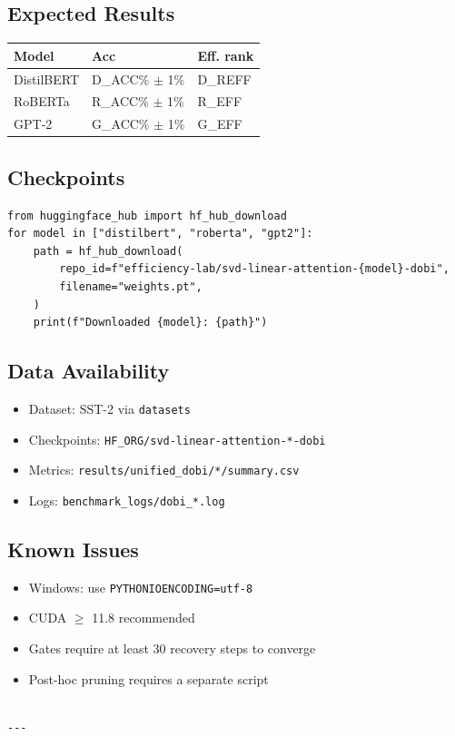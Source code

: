 \subsection{Expected Results}

\begin{table}[H]
\centering
\small
\begin{tabular}{lll}
\toprule
\textbf{Model} & \textbf{Acc} & \textbf{Eff. rank} \\
\midrule
DistilBERT & {{D\_ACC}}\% $\pm$ 1\% & {{D\_REFF}} \\
RoBERTa & {{R\_ACC}}\% $\pm$ 1\% & {{R\_EFF}} \\
GPT-2 & {{G\_ACC}}\% $\pm$ 1\% & {{G\_EFF}} \\
\bottomrule
\end{tabular}
\end{table}

\subsection{Checkpoints}

\begin{lstlisting}
from huggingface_hub import hf_hub_download
for model in ["distilbert", "roberta", "gpt2"]:
    path = hf_hub_download(
        repo_id=f"efficiency-lab/svd-linear-attention-{model}-dobi",
        filename="weights.pt",
    )
    print(f"Downloaded {model}: {path}")
\end{lstlisting}

\subsection{Data Availability}

\begin{itemize}
\item Dataset: SST-2 via \texttt{datasets}
\item Checkpoints: \texttt{{{HF\_ORG}}/svd-linear-attention-*-dobi}
\item Metrics: \texttt{results/unified\_dobi/*/summary.csv}
\item Logs: \texttt{benchmark\_logs/dobi\_*.log}

\end{itemize}
\subsection{Known Issues}

\begin{itemize}
\item Windows: use \texttt{PYTHONIOENCODING=utf-8}
\item CUDA $\ge$ 11.8 recommended
\item Gates require at least 30 recovery steps to converge
\item Post-hoc pruning requires a separate script
\end{itemize}
\begin{lstlisting}

---
\end{lstlisting}